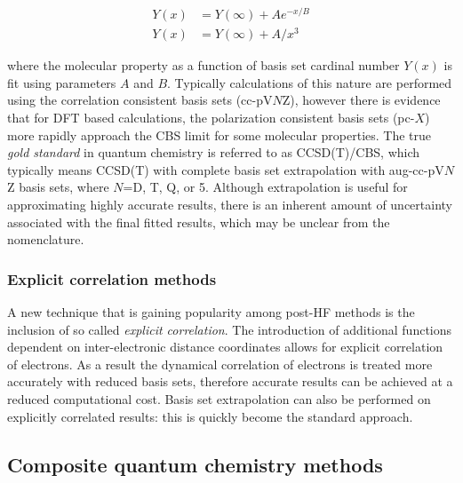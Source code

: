 \begin{align}
  Y(x) &= Y(\infty) + Ae^{-x/B} \\
  Y(x) &= Y(\infty) + A/x^3
\end{align}

\noindent where the molecular property as a function of basis set cardinal
number $Y(x)$ is fit using parameters $A$ and $B$. Typically calculations of
this nature are performed using the correlation consistent basis sets
(cc-pV$N$Z), however there is evidence that for DFT based calculations, the
polarization consistent basis sets (pc-$X$) more rapidly approach the CBS limit
for some molecular properties.\cite{Kupka2007} The true \emph{gold standard} in
quantum chemistry is referred to as CCSD(T)/CBS, which typically means CCSD(T)
with complete basis set extrapolation with aug-cc-pV$N$Z basis sets, where
$N$=D, T, Q, or 5. Although extrapolation is useful for approximating highly
accurate results, there is an inherent amount of uncertainty associated with the
final fitted results, which may be unclear from the nomenclature.

\subsubsection{Explicit correlation methods}

A new technique that is gaining popularity among post-HF methods is the
inclusion of so called \emph{explicit correlation}.\cite{Shiozaki2008,Kohn2008}
The introduction of additional functions dependent on inter-electronic distance
coordinates allows for explicit correlation of electrons.\cite{Tenno2012} As a
result the dynamical correlation of electrons is treated more accurately with
reduced basis sets, therefore accurate results can be achieved at a reduced
computational cost. Basis set extrapolation can also be performed on explicitly
correlated results: this is quickly become the standard
approach.\cite{Feller2013}


\subsection{Composite quantum chemistry methods}

